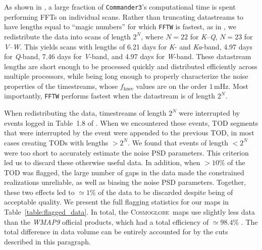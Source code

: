 \documentclass[twocolumn]{../../common/aa}
\def\commanderthree{\texttt{Commander3}}
\newcommand{\Cosmoglobe}{\textsc{Cosmoglobe}}
\newcommand{\K}[0]{\textit K}
\newcommand{\Ka}[0]{\textit{Ka}}
\newcommand{\Q}[0]{\textit Q}
\newcommand{\V}[0]{\textit V}
\newcommand{\W}[0]{\textit W}
\begin{document}
As shown in \citet{bp03}, a large fraction of \commanderthree's computational time is spent performing FFTs on individual scans. Rather than truncating datastreams to have lengths equal to ``magic numbers'' for which \texttt{FFTW} \citep{FFTW05} is fastest, as in \citet{bp03}, 
we redistribute the data into scans of length $2^N$, where $N=22$ for \K--\Q, $N=23$ for \V--\W. This yields scans with lengths of 6.21 days for \K- and \Ka-band, 4.97 days for \Q-band, 7.46 days for \V-band, and 4.97 days for \W-band.
These datastream lengths are short enough to be processed quickly and distributed efficiently across multiple processors, while being long enough to properly characterize the noise properties of the timestreams, whose $f_\mathrm{knee}$ values are on the order $1\,\mathrm{mHz}$. Most importantly, \texttt{FFTW} performs fastest when the datastream is of length $2^N$.

When redistributing the data, timestreams of length $2^N$ were interrupted by events logged in Table~1.8 of \citet{wmapexsupp}.
When we encountered these events, TOD segments that were interrupted by the event were appended to the previous TOD, in most cases creating TODs with lengths $>2^N$. We found that events of length $<2^N$ were too short to accurately estimate the noise PSD parameters. This criterion led us to discard these otherwise useful data. In addition, when $>10\%$ of the TOD was flagged, the large number of gaps in the data made the constrained realizations unreliable, as well as biasing the noise PSD parameters. Together, these two effects led to $\simeq1\%$ of the data to be discarded despite being of acceptable quality. We present the full flagging statistics for our maps in Table~\ref{table:flagged_data}. In total, the \Cosmoglobe\ maps use slightly less data than the \textit{WMAP9} official products, which had a total efficiency of $\simeq98.4\%$ \citep{bennett2012}. The total difference in data volume can be entirely accounted for by the cuts described in this paragraph.
\end{document}
